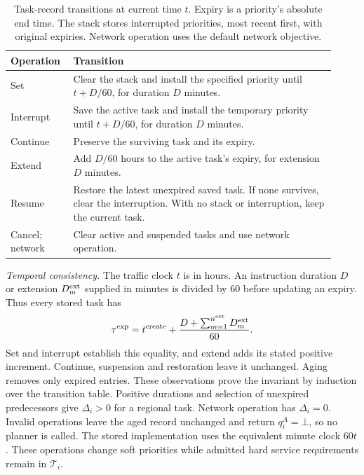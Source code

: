 \documentclass[preprint,12pt]{elsarticle}
\begin{document}
\begin{table}[t]
\centering\small
\caption{Task-record transitions at current time $t$. Expiry is a
priority's absolute end time. The stack stores interrupted priorities,
most recent first, with original expiries. Network operation uses the
default network objective.}
\label{tab:task-state-operations}
\begin{tabular}{@{}p{0.16\linewidth}p{0.76\linewidth}@{}}
\toprule
Operation & Transition\\
\midrule
Set & Clear the stack and install the specified priority until $t+D/60$, for duration $D$ minutes.\\
Interrupt & Save the active task and install the temporary priority until
$t+D/60$, for duration $D$ minutes.\\
Continue & Preserve the surviving task and its expiry.\\
Extend & Add $D/60$ hours to the active task's expiry, for extension $D$ minutes.\\
Resume & Restore the latest unexpired saved task. If none survives, clear
the interruption. With no stack or interruption, keep the current task.\\
Cancel; network & Clear active and suspended tasks and use network operation.\\
\bottomrule
\end{tabular}
\end{table}

\emph{Temporal consistency.} The traffic clock $t$ is in hours.
An instruction duration $D$ or extension $D_m^{\rm ext}$ supplied in
minutes is divided by 60 before updating an expiry. Thus every stored task
has
\begin{equation}
\tau^{\rm exp}=t^{\rm create}
 +\frac{D+\sum_{m=1}^{n^{\rm ext}}D_m^{\rm ext}}{60}.
\label{eq:task-expiry-invariant}
\end{equation}
Set and interrupt establish this equality, and extend adds its stated positive
increment. Continue, suspension and restoration leave it unchanged.
Aging removes only expired entries. These observations prove the invariant
by induction over the transition table. Positive durations and selection
of unexpired predecessors give $\Delta_i>0$ for a regional task. Network
operation has $\Delta_i=0$. Invalid operations leave the aged record
unchanged and return $q_i^A=\bot$, so no planner is called. The stored
implementation uses the equivalent minute clock $60t$. These operations
change soft priorities while admitted hard service requirements remain in
$\mathcal T_i$.
\end{document}
